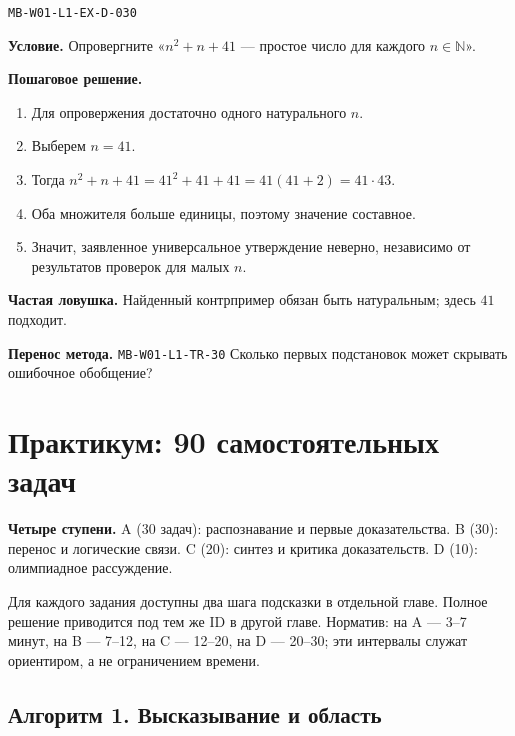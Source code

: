 \documentclass[11pt,a4paper,openany]{book}
\newcommand{\muid}[1]{\texttt{\footnotesize #1}}
\begin{document}
\muid{MB-W01-L1-EX-D-030}\par

\begin{keybox}\textbf{Условие.} Опровергните «$n^2+n+41$ — простое число для каждого $n\in\mathbb N$».\end{keybox}

\textbf{Пошаговое решение.}\par
\begin{enumerate}[label=\arabic*),leftmargin=*,itemsep=3pt,topsep=4pt]
\item Для опровержения достаточно одного натурального $n$.
\item Выберем $n=41$.
\item Тогда $n^2+n+41=41^2+41+41=41(41+2)=41\cdot43$.
\item Оба множителя больше единицы, поэтому значение составное.
\item Значит, заявленное универсальное утверждение неверно, независимо от результатов проверок для малых $n$.
\end{enumerate}


\begin{learnbox}\textbf{Частая ловушка.} Найденный контрпример обязан быть натуральным; здесь $41$ подходит.\par \textbf{Перенос метода.} \muid{MB-W01-L1-TR-30} Сколько первых подстановок может скрывать ошибочное обобщение?\end{learnbox}

\chapter{Практикум: 90 самостоятельных задач}
\begin{keybox}
\textbf{Четыре ступени.} A (30 задач): распознавание и первые доказательства. B (30): перенос и логические связи. C (20): синтез и критика доказательств. D (10): олимпиадное рассуждение.\par
Для каждого задания доступны два шага подсказки в отдельной главе. Полное решение приводится под тем же ID в другой главе. Норматив: на A — 3–7 минут, на B — 7–12, на C — 12–20, на D — 20–30; эти интервалы служат ориентиром, а не ограничением времени.
\end{keybox}

\clearpage{}

\section*{Алгоритм 1. Высказывание и область}
\end{document}
